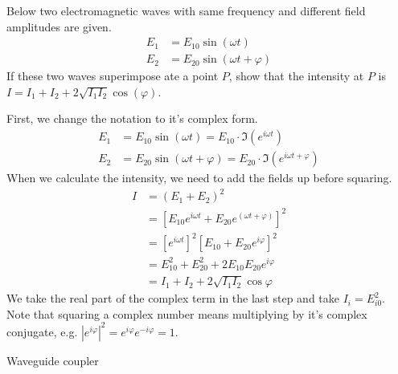 \documentclass[answers, addpoints]{exam} %
\renewcommand{\phi}{\varphi}
\begin{document}
\begin{questions}
\question[10] Below two electromagnetic waves with same frequency and different field amplitudes are given.
\begin{align*}
	E_1 &= E_{10}\sin(\omega t) \\
	E_2 &= E_{20}\sin(\omega t + \phi)
\end{align*}
If these two waves superimpose ate a point $P$, show that the intensity at $P$ is $I = I_1 + I_2 + 2\sqrt{I_1I_2}\cos(\phi)$.
\begin{solution}
	First, we change the notation to it's complex form.
	\begin{align*}
		E_1 &= E_{10}\sin(\omega t)= E_{10}\cdot\Im{\left(e^{i\omega t}\right)} \\
		E_2 &= E_{20}\sin(\omega t + \phi) =E_{20}\cdot\Im{\left(e^{i\omega t + \phi}\right)}
	\end{align*}
	When we calculate the intensity, we need to add the fields up before squaring.
	\begin{align*}
		I &= (E_1+E_2)^2 \\
		&= \left[E_{10}e^{i\omega t} + E_{20}e^{(\omega t +\phi)}\right]^2 \\
		&= \left[e^{i\omega t}\right]^2 \left[E_{10}+E_{20}e^{i\phi}\right]^2 \\
		&= E_{10}^2+E_{20}^2+2E_{10}E_{20}e^{i\phi} \\
		&= I_1+I_2+2\sqrt{I_1I_2}\cos\phi
	\end{align*}
	We take the real part of the complex term in the last step and take $I_{i} = E_{i0}^2$.
	Note that squaring a complex number means multiplying by it's complex conjugate, e.g. $\left|e^{i\phi}\right|^2 = e^{i\phi}e^{-i\phi} = 1$.
\end{solution}

\question[10] Waveguide coupler
\end{questions}
\end{document}
